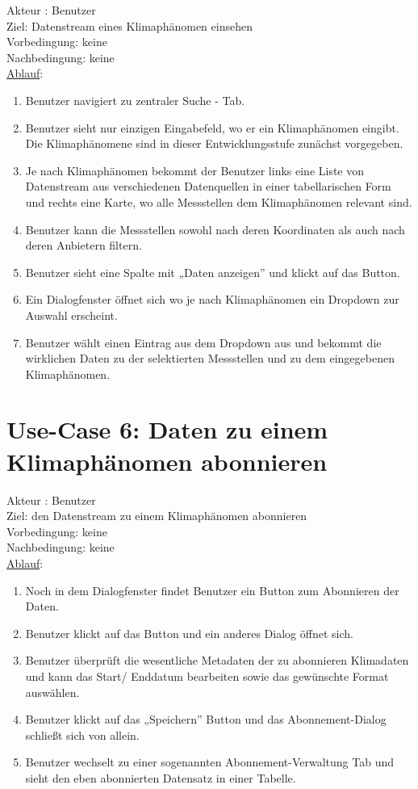 \documentclass[a4paper,12pt]{scrreprt}
\begin{document}
Akteur : Benutzer\\
Ziel: Datenstream eines Klimaphänomen einsehen\\
Vorbedingung: keine\\
Nachbedingung: keine\\
\underline{Ablauf}:
\begin{enumerate}
	\item Benutzer navigiert zu zentraler Suche - Tab.
	\item Benutzer sieht nur einzigen Eingabefeld, wo er ein Klimaphänomen eingibt. Die Klimaphänomene sind in dieser Entwicklungsstufe zunächst vorgegeben.
	\item Je nach Klimaphänomen bekommt der Benutzer links eine Liste von Datenstream aus verschiedenen Datenquellen in einer tabellarischen Form und rechts eine Karte, wo alle Messstellen dem Klimaphänomen relevant sind.
	\item Benutzer kann die Messstellen sowohl nach deren Koordinaten als auch nach deren Anbietern filtern.
	\item Benutzer sieht eine Spalte mit „Daten anzeigen” und klickt auf das Button.
	\item Ein Dialogfenster öffnet sich wo je nach Klimaphänomen ein Dropdown zur Auswahl erscheint.
	\item Benutzer wählt einen Eintrag aus dem Dropdown aus und bekommt die wirklichen Daten zu der selektierten Messstellen und zu dem eingegebenen Klimaphänomen.
\end{enumerate}

\section*{\small \textbf{Use-Case 6: Daten zu einem Klimaphänomen abonnieren}}
Akteur : Benutzer\\
Ziel: den Datenstream zu einem Klimaphänomen abonnieren\\
Vorbedingung: keine\\
Nachbedingung: keine\\
\underline{Ablauf}:
\begin{enumerate}
\item Noch in dem Dialogfenster findet Benutzer ein Button zum Abonnieren der Daten. 
\item Benutzer klickt auf das Button und ein anderes Dialog öffnet sich.
\item Benutzer überprüft die wesentliche Metadaten der zu abonnieren Klimadaten und kann das Start/ Enddatum bearbeiten sowie das gewünschte Format auswählen.
\item Benutzer klickt auf das „Speichern” Button und  das Abonnement-Dialog schließt sich von allein.
\item Benutzer wechselt zu einer sogenannten Abonnement-Verwaltung Tab und sieht den eben abonnierten Datensatz in einer Tabelle.
\end{enumerate}
\end{document}
